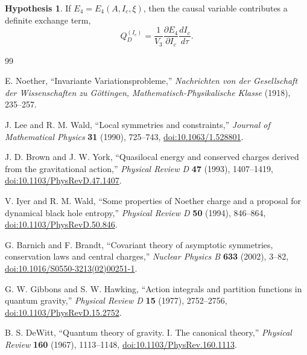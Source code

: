 \documentclass[11pt,a4paper]{article}
\def\dd{d}%
\numberwithin{equation}{section}
\theoremstyle{definition}
\newtheorem{hypothesis}[criterion]{Hypothesis}
\theoremstyle{plain}
\theoremstyle{remark}
\newcommand{\Efour}{E_4}
\newcommand{\dd}{\mathrm{d}}
\begin{document}
\begin{hypothesis}
If \(\Efour=\Efour(A,I_c,\xi)\), then the causal variable contributes a definite exchange term,
\begin{equation}
Q_D^{(I_c)}=\frac{1}{V_3}\frac{\partial\Efour}{\partial I_c}\frac{\dd I_c}{\dd\tau}.
\end{equation}
\end{hypothesis}



\begin{thebibliography}{99}

E. Noether, ``Invariante Variationsprobleme,'' \emph{Nachrichten von der Gesellschaft der Wissenschaften zu G\"ottingen, Mathematisch-Physikalische Klasse} (1918), 235--257.

J. Lee and R. M. Wald, ``Local symmetries and constraints,'' \emph{Journal of Mathematical Physics} \textbf{31} (1990), 725--743, \href{https://doi.org/10.1063/1.528801}{doi:10.1063/1.528801}.

J. D. Brown and J. W. York, ``Quasilocal energy and conserved charges derived from the gravitational action,'' \emph{Physical Review D} \textbf{47} (1993), 1407--1419, \href{https://doi.org/10.1103/PhysRevD.47.1407}{doi:10.1103/PhysRevD.47.1407}.

V. Iyer and R. M. Wald, ``Some properties of Noether charge and a proposal for dynamical black hole entropy,'' \emph{Physical Review D} \textbf{50} (1994), 846--864, \href{https://doi.org/10.1103/PhysRevD.50.846}{doi:10.1103/PhysRevD.50.846}.

G. Barnich and F. Brandt, ``Covariant theory of asymptotic symmetries, conservation laws and central charges,'' \emph{Nuclear Physics B} \textbf{633} (2002), 3--82, \href{https://doi.org/10.1016/S0550-3213(02)00251-1}{doi:10.1016/S0550-3213(02)00251-1}.

G. W. Gibbons and S. W. Hawking, ``Action integrals and partition functions in quantum gravity,'' \emph{Physical Review D} \textbf{15} (1977), 2752--2756, \href{https://doi.org/10.1103/PhysRevD.15.2752}{doi:10.1103/PhysRevD.15.2752}.

B. S. DeWitt, ``Quantum theory of gravity. I. The canonical theory,'' \emph{Physical Review} \textbf{160} (1967), 1113--1148, \href{https://doi.org/10.1103/PhysRev.160.1113}{doi:10.1103/PhysRev.160.1113}.


\end{thebibliography}
\end{document}
